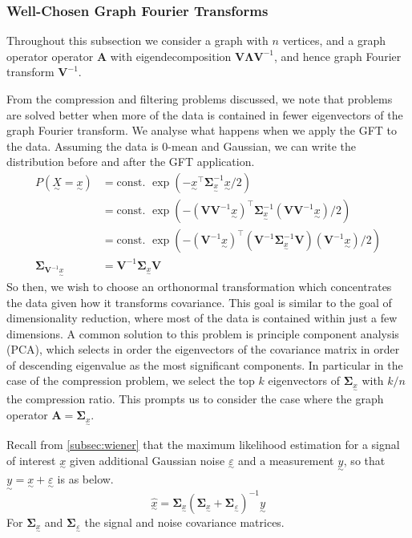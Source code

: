 \documentclass[12pt,a4paper]{article} %
\newcommand{\ve}[1]{\underset{\sim}{#1}}
\begin{document}
\subsubsection{Well-Chosen Graph Fourier Transforms}
\label{subsec:well_chosen_GFT}
Throughout this subsection we consider a graph with $n$ vertices, and a graph operator operator $\pmb{A}$ with eigendecomposition $\pmb{V\Lambda V}^{-1}$, and hence graph Fourier transform $\pmb{V}^{-1}$.

From the compression and filtering problems discussed, we note that problems are solved better when more of the data is contained in fewer eigenvectors of the graph Fourier transform. We analyse what happens when we apply the GFT to the data. Assuming the data is 0-mean and Gaussian, we can write the distribution before and after the GFT application.
\begin{align*}
    P(\ve{X}=\ve{x})&=\text{const. }\exp(-\ve{x}^\top \pmb{\Sigma}_{\ve{x}}^{-1} \ve{x}/2)\\
    &=\text{const. }\exp(-(\pmb{VV}^{-1}\ve{x})^\top \pmb{\Sigma}_{\ve{x}}^{-1} (\pmb{VV}^{-1}\ve{x})/2)\\
    &=\text{const. }\exp(-(\pmb{V}^{-1}\ve{x})^\top (\pmb{V}^{-1}\pmb{\Sigma}_{\ve{x}}^{-1} \pmb{V})(\pmb{V}^{-1}\ve{x})/2)\\
    \pmb{\Sigma}_{\pmb{V}^{-1}\ve{x}}&=\pmb{V}^{-1}\pmb{\Sigma}_{\ve{x}}\pmb{V}
\end{align*}
So then, we wish to choose an orthonormal transformation which concentrates the data given how it transforms covariance. This goal is similar to the goal of dimensionality reduction, where most of the data is contained within just a few dimensions. A common solution to this problem is principle component analysis (PCA), which selects in order the eigenvectors of the covariance matrix in order of descending eigenvalue as the most significant components. In particular in the case of the compression problem, we select the top $k$ eigenvectors of $\pmb{\Sigma}_{\ve{x}}$ with $k/n$ the compression ratio. This prompts us to consider the case where the graph operator $\pmb{A}=\pmb{\Sigma}_{\ve{x}}$.

Recall from \ref{subsec:wiener} that the maximum likelihood estimation for a signal of interest $\ve{x}$ given additional Gaussian noise $\ve{\varepsilon}$ and a measurement $\ve{y}$, so that $\ve{y}=\ve{x}+\ve{\varepsilon}$ is as below.
\[
    \hat{\ve{x}}=\pmb{\Sigma}_{\ve{x}}(\pmb{\Sigma}_{\ve{x}}+\pmb{\Sigma}_{\ve{\varepsilon}})^{-1}\ve{y}
\]
For $\pmb{\Sigma}_{\ve{x}}$ and $\pmb{\Sigma}_{\ve{\varepsilon}}$ the signal and noise covariance matrices.
\end{document}
